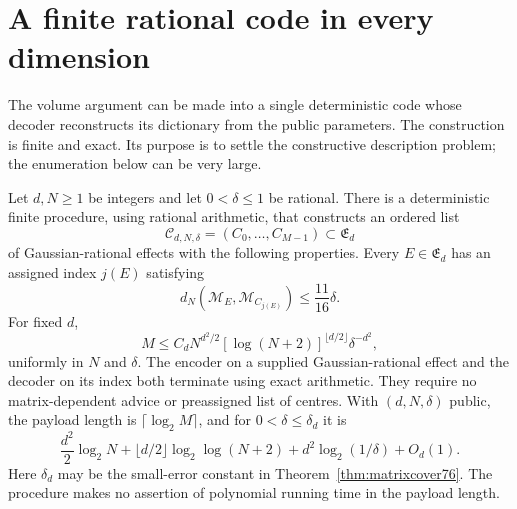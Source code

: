 \section{A finite rational code in every dimension}
\label{sec:matrixcodec77}

The volume argument can be made into a single deterministic code whose
decoder reconstructs its dictionary from the public parameters.  The
construction is finite and exact.  Its purpose is to settle the
constructive description problem; the enumeration below can be very
large.

\begin{theorem}
\label{thm:matrixcodec77}
Let $d,N\ge1$ be integers and let $0<\delta\le1$ be rational.  There is
a deterministic finite procedure, using rational arithmetic, that
constructs an ordered list
\[
 \mathcal C_{d,N,\delta}=(C_0,\ldots,C_{M-1})\subset\mathfrak E_d
\]
of Gaussian-rational effects with the following properties.
Every $E\in\mathfrak E_d$ has an assigned index $j(E)$ satisfying
\begin{equation}\label{eq:matrixcodecerror77}
 d_N(\mathcal M_E,\mathcal M_{C_{j(E)}})\le\frac{11}{16}\delta.
\end{equation}
For fixed $d$,
\begin{equation}\label{eq:matrixcodecsize77}
 M\le C_d N^{d^2/2}[\log(N+2)]^{\lfloor d/2\rfloor}\delta^{-d^2},
\end{equation}
uniformly in $N$ and $\delta$.  The encoder on a supplied
Gaussian-rational effect and the decoder on its index both terminate
using exact arithmetic.  They require no matrix-dependent advice or
preassigned list of centres.  With $(d,N,\delta)$ public, the payload
length is $\lceil\log_2 M\rceil$, and for
$0<\delta\le\delta_d$ it is
\begin{equation}\label{eq:matrixcodecbits77}
 \frac{d^2}{2}\log_2N
 +\lfloor d/2\rfloor\log_2\log(N+2)
 +d^2\log_2(1/\delta)+O_d(1).
\end{equation}
Here $\delta_d$ may be the small-error constant in
Theorem~\ref{thm:matrixcover76}.  The procedure makes no assertion
of polynomial running time in the payload length.
\end{theorem}

